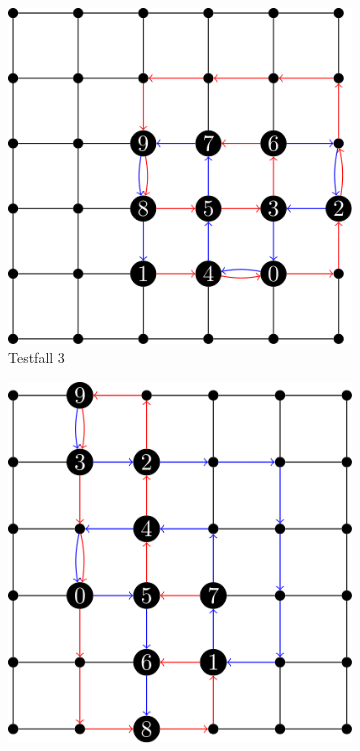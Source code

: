 \documentclass[bachelor, german]{algothesis}
\begin{document}
\begin{figure}[H]
    \centering
    \begin{subfigure}[b]{0.45\textwidth}
        \centering
        \includegraphics[width=\textwidth]{figures/Testfall3.png}
        \caption{Testfall 3}
        \label{fig:teilbild_a}
    \end{subfigure}
    \hfill
    \begin{subfigure}[b]{0.45\textwidth}
        \centering
        \includegraphics[width=\textwidth]{figures/Testfall4.png}

\end{subfigure}
\end{figure}
\end{document}
